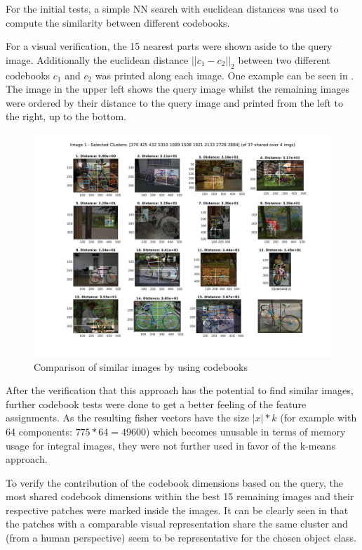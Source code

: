 For the initial tests, a simple \acf{NN} search with euclidean distances was used to compute the similarity between different codebooks.

For a visual verification, the 15 nearest parts were shown aside to the query image. Additionally the euclidean distance $||c_1-c_2||_2$ between two different codebooks $c_1$ and $c_2$ was printed along each image. One example can be seen in . The image in the upper left shows the query image whilst the remaining images were ordered by their distance to the query image and printed from the left to the right, up to the bottom.

\begin{figure}
\centering
\includegraphics[width=\linewidth]{images/codebook_similiar}
\caption{Comparison of similar images by using codebooks}
\label{fig:nn_query_search}
\end{figure}


After the verification that this approach has the potential to find similar images, further codebook tests were done to get a better feeling of the feature assignments. As the resulting fisher vectors have the size $|x| * k$ (for example with 64 components: $775 * 64 = 49600$) which becomes unusable in terms of memory usage for integral images, they were not further used in favor of the k-means approach.

To verify the contribution of the codebook dimensions based on the query, the most shared codebook dimensions within the best 15 remaining images and their respective patches were marked inside the images. It can be clearly seen in  that the patches with a comparable visual representation share the same cluster and (from a human perspective) seem to be representative for the chosen object class.




